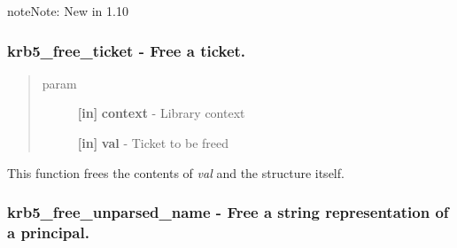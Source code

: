 \documentclass[letterpaper,10pt,english]{sphinxmanual}
\begin{document}
\begin{notice}{note}{Note:}
New in 1.10
\end{notice}


\subsubsection{krb5\_free\_ticket -  Free a ticket.}
\label{appdev/refs/api/krb5_free_ticket:krb5-free-ticket-free-a-ticket}\label{appdev/refs/api/krb5_free_ticket::doc}

\begin{fulllineitems}
\label{appdev/refs/api/krb5_free_ticket:c.krb5_free_ticket}
\end{fulllineitems}

\begin{quote}\begin{description}
\item[{param}] \leavevmode
\textbf{{[}in{]}} \textbf{context} - Library context

\textbf{{[}in{]}} \textbf{val} - Ticket to be freed

\end{description}\end{quote}

This function frees the contents of \emph{val} and the structure itself.


\subsubsection{krb5\_free\_unparsed\_name -  Free a string representation of a principal.}
\label{appdev/refs/api/krb5_free_unparsed_name::doc}\label{appdev/refs/api/krb5_free_unparsed_name:krb5-free-unparsed-name-free-a-string-representation-of-a-principal}

\begin{fulllineitems}
\label{appdev/refs/api/krb5_free_unparsed_name:c.krb5_free_unparsed_name}
\end{fulllineitems}
\end{document}
